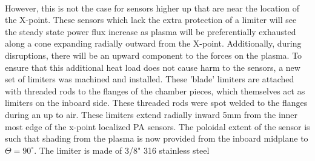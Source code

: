 \paragraph{}However, this is not the case for sensors higher up that are near the location of the X-point.  These sensors which lack the extra protection of a limiter will see the steady state power flux increase as plasma will be preferentially exhausted along a cone expanding radially outward from the X-point.  Additionally, during disruptions, there will be an upward component to the forces on the plasma.  To ensure that this additional heat load does not cause harm to the sensors, a new set of limiters was machined and installed.  These 'blade' limiters are attached with threaded rods to the flanges of the chamber pieces, which themselves act as limiters on the inboard side.  These threaded rods were spot welded to the flanges during an up to air.  These limiters extend radially inward 5mm from the inner most edge of the x-point localized PA sensors.  The poloidal extent of the sensor is such that shading from the plasma is now provided from the inboard midplane to $\Theta = 90^{\circ}$.  The limiter is made of 3/8" 316 stainless steel
